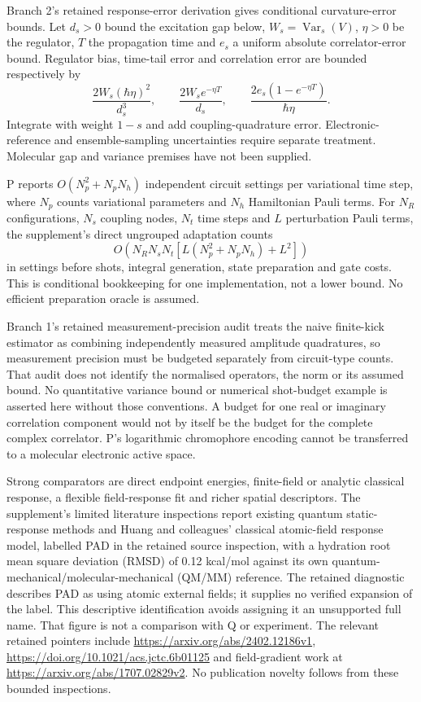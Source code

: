 \documentclass{article}
\begin{document}
Branch 2's retained response-error derivation gives conditional curvature-error bounds. Let $d_s>0$ bound the excitation gap below, $W_s=\operatorname{Var}_s(V)$, $\eta>0$ be the regulator, $T$ the propagation time and $e_s$ a uniform absolute correlator-error bound. Regulator bias, time-tail error and correlation error are bounded respectively by
\begin{equation*}
\frac{2W_s(\hbar\eta)^2}{d_s^3},\qquad
\frac{2W_s e^{-\eta T}}{d_s},\qquad
\frac{2e_s(1-e^{-\eta T})}{\hbar\eta}.
\end{equation*}
Integrate with weight $1-s$ and add coupling-quadrature error. Electronic-reference and ensemble-sampling uncertainties require separate treatment. Molecular gap and variance premises have not been supplied.

P reports $O(N_p^2+N_pN_h)$ independent circuit settings per variational time step, where $N_p$ counts variational parameters and $N_h$ Hamiltonian Pauli terms. For $N_R$ configurations, $N_s$ coupling nodes, $N_t$ time steps and $L$ perturbation Pauli terms, the supplement's direct ungrouped adaptation counts
\begin{equation*}
O\left(N_RN_sN_t\left[L(N_p^2+N_pN_h)+L^2\right]\right)
\end{equation*}
in settings before shots, integral generation, state preparation and gate costs. This is conditional bookkeeping for one implementation, not a lower bound. No efficient preparation oracle is assumed.

Branch 1's retained measurement-precision audit treats the naive finite-kick estimator as combining independently measured amplitude quadratures, so measurement precision must be budgeted separately from circuit-type counts. That audit does not identify the normalised operators, the norm or its assumed bound. No quantitative variance bound or numerical shot-budget example is asserted here without those conventions. A budget for one real or imaginary correlation component would not by itself be the budget for the complete complex correlator. P's logarithmic chromophore encoding cannot be transferred to a molecular electronic active space.

Strong comparators are direct endpoint energies, finite-field or analytic classical response, a flexible field-response fit and richer spatial descriptors. The supplement's limited literature inspections report existing quantum static-response methods and Huang and colleagues' classical atomic-field response model, labelled PAD in the retained source inspection, with a hydration root mean square deviation (RMSD) of 0.12 kcal/mol against its own quantum-mechanical/molecular-mechanical (QM/MM) reference. The retained diagnostic describes PAD as using atomic external fields; it supplies no verified expansion of the label. This descriptive identification avoids assigning it an unsupported full name. That figure is not a comparison with Q or experiment. The relevant retained pointers include \url{https://arxiv.org/abs/2402.12186v1}, \url{https://doi.org/10.1021/acs.jctc.6b01125} and field-gradient work at \url{https://arxiv.org/abs/1707.02829v2}. No publication novelty follows from these bounded inspections.
\end{document}
